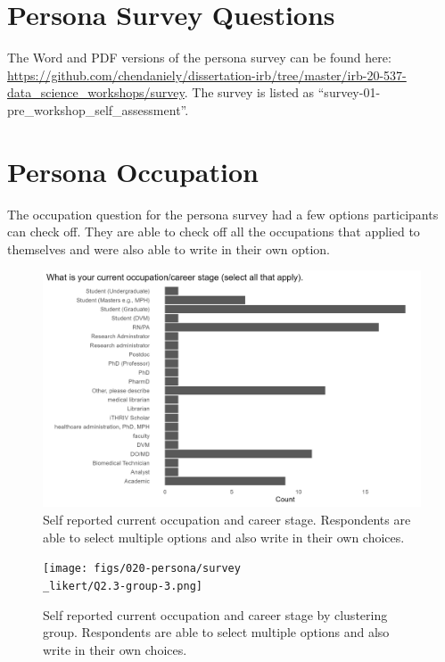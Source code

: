 \documentclass[../main.tex]{subfiles}
\begin{document}
    \section{Persona Survey Questions}

    The Word and PDF versions of the persona survey can be found here:
    \url{https://github.com/chendaniely/dissertation-irb/tree/master/irb-20-537-data\_science\_workshops/survey}.
    The survey is listed as ``survey-01-pre\_workshop\_self\_assessment''.

    \section{Persona Occupation}

        The occupation question for the persona survey had a few options participants can check off.
        They are able to check off all the occupations that applied to themselves and were also able to write in their own option.

        \begin{figure}[htb]
            \centering
            \includegraphics[width=0.7\linewidth]{figs/020-persona/Q2.3.png}
            \caption[What is your current occupation/career stage (select all that apply)]
            {Self reported current occupation and career stage.
                Respondents are able to select multiple options and also write in their own choices.
            }
            \label{fig:demographics_occupation}
        \end{figure}

        \begin{figure}[htb]
            \centering
            \texttt{[image: figs/020-persona/survey\\\_likert/Q2.3-group-3.png]}
            \caption[What is your current occupation/career stage by group (select all that apply)]
            {Self reported current occupation and career stage by clustering group.
                Respondents are able to select multiple options and also write in their own choices.
            }
            \label{fig:demographics_occupation_cluster}
        \end{figure}
\end{document}
